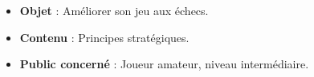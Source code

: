 \begin{titlepage}
\vfill

\begin{itemize}[leftmargin=1cm, label=, itemsep=1pt]
\item {\bf Objet} : Améliorer son jeu aux échecs.
\item {\bf Contenu} : Principes stratégiques.%
\item {\bf Public concerné} : Joueur amateur, niveau intermédiaire.
\end{itemize}

\end{titlepage}
